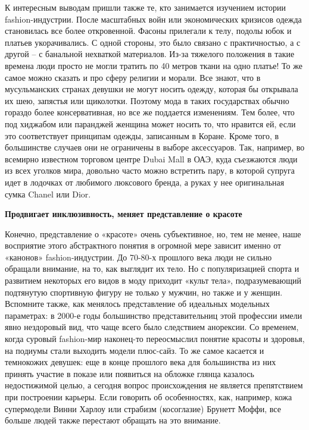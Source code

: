 К интересным выводам пришли также те, кто занимается изучением истории fashion-индустрии. После масштабных войн или экономических кризисов одежда становилась все более откровенной. Фасоны прилегали к телу, подолы юбок и платьев укорачивались. С одной стороны, это было связано с практичностью, а с другой – с банальной нехваткой материалов. Из-за тяжелого положения в такие времена люди просто не могли тратить по 40 метров ткани на одно платье!
То же самое можно сказать и про сферу религии и морали. Все знают, что в мусульманских странах девушки не могут носить одежду, которая бы открывала их шею, запястья или щиколотки. Поэтому мода в таких государствах обычно гораздо более консервативная, но все же поддается изменениям. Тем более, что под хиджабом или паранджей женщина может носить то, что нравится ей, если это соответствует принципам одежды, записанным в Коране. Кроме того, в большинстве случаев они не ограничены в выборе аксессуаров. Так, например, во всемирно известном торговом центре Dubai Mall в ОАЭ, куда съезжаются люди из всех уголков мира, довольно часто можно встретить пару, в которой супруга идет в лодочках от любимого люксового бренда, а руках у нее оригинальная сумка Chanel или Dior.

\textbf{Продвигает инклюзивность, меняет представление о красоте}

Конечно, представление о «красоте» очень субъективное, но, тем не менее, наше восприятие этого абстрактного понятия в огромной мере зависит именно от «канонов» fashion-индустрии. До 70-80-х прошлого века люди не сильно обращали внимание, на то, как выглядит их тело. Но с популяризацией спорта и развитием некоторых его видов в моду приходит «культ тела», подразумевающий подтянутую спортивную фигуру не только у мужчин, но также и у женщин. Вспомните также, как менялось представление об идеальных модельных параметрах: в 2000-е годы большинство представительниц этой профессии имели явно нездоровый вид, что чаще всего было следствием анорексии. Со временем, когда суровый fashion-мир наконец-то переосмыслил понятие красоты и здоровья, на подиумы стали выходить модели плюс-сайз. То же самое касается и темнокожих девушек: еще в конце прошлого века для большинства из них принять участие в показе или появиться на обложке глянца казалось недостижимой целью, а сегодня вопрос происхождения не является препятствием при построении карьеры. Если говорить об особенностях, как, например, кожа супермодели Винни Харлоу или страбизм (косоглазие) Брунетт Моффи, все больше людей также перестают обращать на это внимание.

